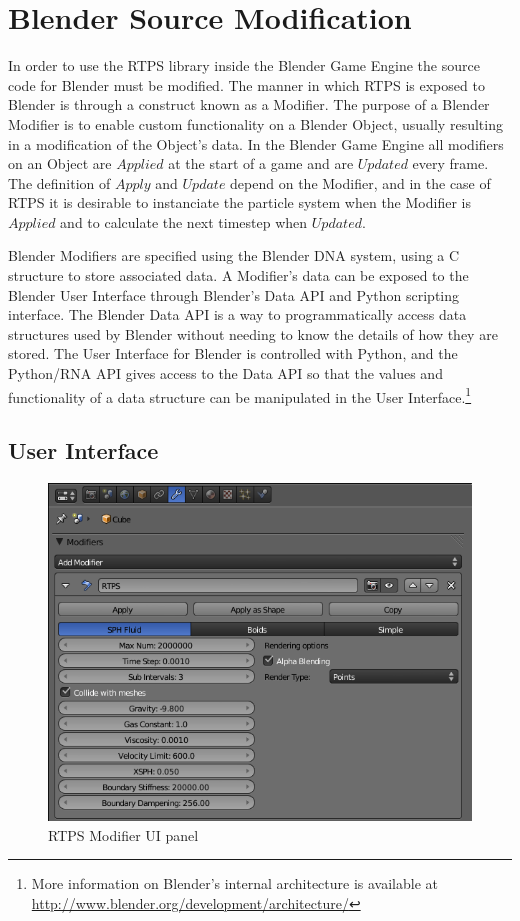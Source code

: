 \section{Blender Source Modification}

In order to use the RTPS library inside the Blender Game Engine the source code
for Blender must be modified. The manner in which RTPS is exposed to Blender is
through a construct known as a Modifier. The purpose of a Blender Modifier is
to enable custom functionality on a Blender Object, usually resulting in a
modification of the Object's data. In the Blender Game Engine all modifiers on an Object are
$Applied$ at the start of a game and are $Updated$ every frame. The definition
of $Apply$ and $Update$ depend on the Modifier, and in the case of RTPS it is
desirable to instanciate the particle system when the Modifier is $Applied$ and
to calculate the next timestep when $Updated$.


Blender Modifiers are specified using the Blender DNA system, using a C
structure to store associated data. A Modifier's data can be exposed to the Blender User Interface
through Blender's Data API and Python scripting interface. The Blender Data API
is a way to programmatically access data structures used by Blender without
needing to know the details of how they are stored.\cite{b3dDataAPI} The User
Interface for Blender is controlled with Python, and the Python/RNA API gives
access to the Data API so that the values and functionality of a data structure
can be manipulated in the User Interface.\footnote{More information on
Blender's internal architecture is available at
\url{http://www.blender.org/development/architecture/}}


\subsection{User Interface}
\begin{figure}[!htc]
 		\centering
		\includegraphics[scale=0.6]{figures/ui_mod.png}
        \caption{ RTPS Modifier UI panel }
		\label{fig:ui_emitter}
\end{figure}


